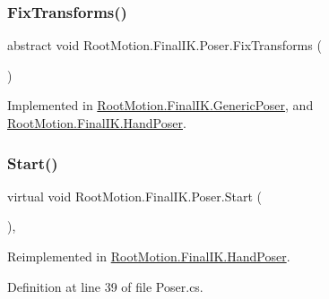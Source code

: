 \subsubsection{\texorpdfstring{Fix\+Transforms()}{FixTransforms()}}
{\footnotesize\ttfamily abstract void Root\+Motion.\+Final\+I\+K.\+Poser.\+Fix\+Transforms (\begin{DoxyParamCaption}{ }\end{DoxyParamCaption})\hspace{0.3cm}{\ttfamily [pure virtual]}}



Implemented in \mbox{\hyperlink{class_root_motion_1_1_final_i_k_1_1_generic_poser_af53f1cc65fae557e3aeaf9dd6b0181b9}{Root\+Motion.\+Final\+I\+K.\+Generic\+Poser}}, and \mbox{\hyperlink{class_root_motion_1_1_final_i_k_1_1_hand_poser_af5d88be3e8ab503e82e27be0838dc586}{Root\+Motion.\+Final\+I\+K.\+Hand\+Poser}}.

\mbox{\label{class_root_motion_1_1_final_i_k_1_1_poser_a7efdee80ce26a62a3ec056bb4e261a1c}} 
\subsubsection{\texorpdfstring{Start()}{Start()}}
{\footnotesize\ttfamily virtual void Root\+Motion.\+Final\+I\+K.\+Poser.\+Start (\begin{DoxyParamCaption}{ }\end{DoxyParamCaption})\hspace{0.3cm}{\ttfamily [protected]}, {\ttfamily [virtual]}}



Reimplemented in \mbox{\hyperlink{class_root_motion_1_1_final_i_k_1_1_hand_poser_a99f98f5003f3cdedba368fafd6168234}{Root\+Motion.\+Final\+I\+K.\+Hand\+Poser}}.



Definition at line 39 of file Poser.\+cs.

\mbox{\label{class_root_motion_1_1_final_i_k_1_1_poser_ab5636eab097e6dbd2c7f3819c8508918}} 
